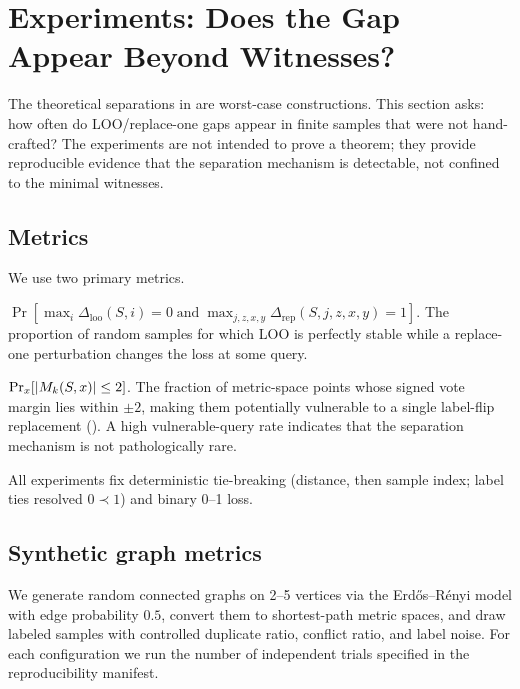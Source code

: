 \section{Experiments: Does the Gap Appear Beyond Witnesses?}
\label{sec:experiments}

The theoretical separations in
 are
worst-case constructions.  This section asks: how often do LOO/replace-one gaps
appear in finite samples that were not hand-crafted?  The experiments are not
intended to prove a theorem; they provide reproducible evidence that the
separation mechanism is detectable, not confined to the minimal witnesses.

\subsection{Metrics}

We use two primary metrics.

\begin{description}[leftmargin=*,style=nextline]
    \item[Strict separation frequency]
        $\Pr[\max_i \Delta_{\mathrm{loo}}(S,i) = 0 \;\text{and}\;
        \max_{j,z,x,y} \Delta_{\mathrm{rep}}(S,j,z,x,y) = 1]$.
        The proportion of random samples for which LOO is perfectly stable
        while a replace-one perturbation changes the loss at some query.
    \item[Vulnerable-query rate]
        $\Pr_x[|M_k(S,x)| \le 2]$.
        The fraction of metric-space points whose signed vote margin lies
        within $\pm 2$, making them potentially vulnerable to a single
        label-flip replacement ().  A high vulnerable-query rate
        indicates that the separation mechanism is not pathologically rare.
\end{description}

All experiments fix deterministic tie-breaking (distance, then sample index;
label ties resolved $0 \prec 1$) and binary 0--1 loss.

\subsection{Synthetic graph metrics}

We generate random connected graphs on 2--5 vertices via the
Erd\H{o}s--R\'enyi model with edge probability $0.5$, convert them to
shortest-path metric spaces, and draw labeled samples with controlled duplicate
ratio, conflict ratio, and label noise.  For each configuration we run the
number of independent trials specified in the reproducibility manifest.


